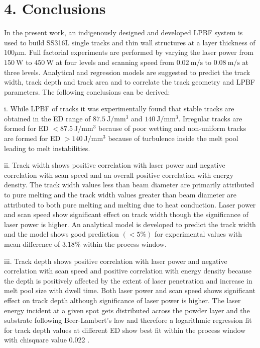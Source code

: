 \documentclass[10pt]{article}
\begin{document}
\section*{4. Conclusions}
In the present work, an indigenously designed and developed LPBF system is used to build SS316L single tracks and thin wall structures at a layer thickness of $100 \mu \mathrm{m}$. Full factorial experiments are performed by varying the laser power from $150 \mathrm{~W}$ to $450 \mathrm{~W}$ at four levels and scanning speed from $0.02 \mathrm{~m} / \mathrm{s}$ to $0.08 \mathrm{~m} / \mathrm{s}$ at three levels. Analytical and regression models are suggested to predict the track width, track depth and track area and to correlate the track geometry and LPBF parameters. The following conclusions can be derived:

i. While LPBF of tracks it was experimentally found that stable tracks are obtained in the ED range of $87.5 \mathrm{~J} / \mathrm{mm}^{3}$ and $140 \mathrm{~J} / \mathrm{mm}^{3}$. Irregular tracks are formed for ED $<87.5 \mathrm{~J} / \mathrm{mm}^{3}$ because of poor wetting and non-uniform tracks are formed for ED $>140 \mathrm{~J} / \mathrm{mm}^{3}$ because of turbulence inside the melt pool leading to melt instabilities.

ii. Track width shows positive correlation with laser power and negative correlation with scan speed and an overall positive correlation with energy density. The track width values less than beam diameter are primarily attributed to pure melting and the track width values greater than beam diameter are attributed to both pure melting and melting due to heat conduction. Laser power and scan speed show significant effect on track width though the significance of laser power is higher. An analytical model is developed to predict the track width and the model shows good prediction $(<5 \%)$ for experimental values with mean difference of $3.18 \%$ within the process window.

iii. Track depth shows positive correlation with laser power and negative correlation with scan speed and positive correlation with energy density because the depth is positively affected by the extent of laser penetration and increase in melt pool size with dwell time. Both laser power and scan speed shows significant effect on track depth although significance of laser power is higher. The laser energy incident at a given spot gets distributed across the powder layer and the substrate following Beer-Lambert's law and therefore a logarithmic regression fit for track depth values at different ED show best fit within the process window with chisquare value 0.022 .
\end{document}
